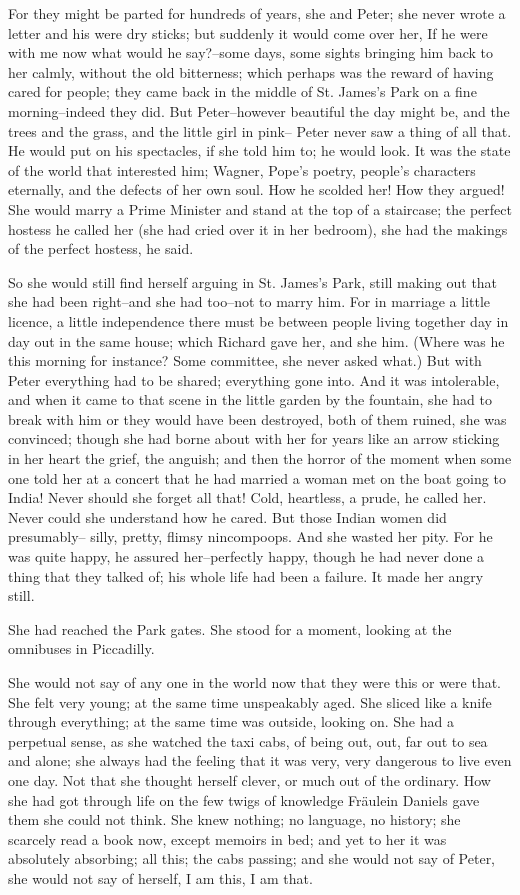 \documentclass[lang=cn,10pt]{elegantbook}
\begin{document}
For they might be parted for hundreds of years, she and Peter; she
never wrote a letter and his were dry sticks; but suddenly it would
come over her, If he were with me now what would he say?--some
days, some sights bringing him back to her calmly, without the old
bitterness; which perhaps was the reward of having cared for
people; they came back in the middle of St. James's Park on a fine
morning--indeed they did.  But Peter--however beautiful the day
might be, and the trees and the grass, and the little girl in pink--
Peter never saw a thing of all that.  He would put on his
spectacles, if she told him to; he would look.  It was the state of
the world that interested him; Wagner, Pope's poetry, people's
characters eternally, and the defects of her own soul.  How he
scolded her!  How they argued!  She would marry a Prime Minister
and stand at the top of a staircase; the perfect hostess he called
her (she had cried over it in her bedroom), she had the makings of
the perfect hostess, he said.

So she would still find herself arguing in St. James's Park, still
making out that she had been right--and she had too--not to marry
him.  For in marriage a little licence, a little independence there
must be between people living together day in day out in the same
house; which Richard gave her, and she him.  (Where was he this
morning for instance?  Some committee, she never asked what.)  But
with Peter everything had to be shared; everything gone into.  And
it was intolerable, and when it came to that scene in the little
garden by the fountain, she had to break with him or they would
have been destroyed, both of them ruined, she was convinced; though
she had borne about with her for years like an arrow sticking in
her heart the grief, the anguish; and then the horror of the moment
when some one told her at a concert that he had married a woman met
on the boat going to India!  Never should she forget all that!
Cold, heartless, a prude, he called her.  Never could she
understand how he cared.  But those Indian women did presumably--
silly, pretty, flimsy nincompoops.  And she wasted her pity.  For
he was quite happy, he assured her--perfectly happy, though he had
never done a thing that they talked of; his whole life had been a
failure.  It made her angry still.

She had reached the Park gates.  She stood for a moment, looking at
the omnibuses in Piccadilly.

She would not say of any one in the world now that they were this
or were that.  She felt very young; at the same time unspeakably
aged.  She sliced like a knife through everything; at the same time
was outside, looking on.  She had a perpetual sense, as she watched
the taxi cabs, of being out, out, far out to sea and alone; she
always had the feeling that it was very, very dangerous to live
even one day.  Not that she thought herself clever, or much out of
the ordinary.  How she had got through life on the few twigs of
knowledge Fräulein Daniels gave them she could not think.  She knew
nothing; no language, no history; she scarcely read a book now,
except memoirs in bed; and yet to her it was absolutely absorbing;
all this; the cabs passing; and she would not say of Peter, she
would not say of herself, I am this, I am that.
\end{document}
